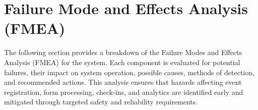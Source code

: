 \documentclass[12pt]{article}
\begin{document}
\section{Failure Mode and Effects Analysis (FMEA)}

The following section provides a breakdown of the Failure Modes and Effects Analysis (FMEA) for the system. Each component is evaluated for potential failures, their impact on system operation, possible causes, methods of detection, and recommended actions. This analysis ensures that hazards affecting event registration, form processing, check-ins, and analytics are identified early and mitigated through targeted safety and reliability requirements.

\begingroup
\scriptsize
\setlength{\tabcolsep}{2pt}
\renewcommand{\arraystretch}{1.25}
\setlength{\LTleft}{0pt}
\setlength{\LTright}{0pt}
\end{document}
